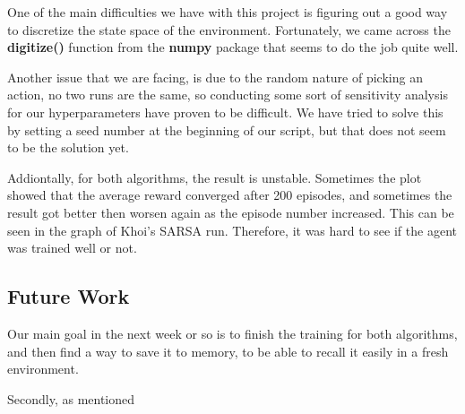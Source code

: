 \documentclass[nohyperref]{article}
\theoremstyle{plain}
\theoremstyle{definition}
\theoremstyle{remark}
\newcommand{\cnote}[1]{\textsf{\color{blue} [#1]}}
\begin{document}
One of the main difficulties we have with this project is figuring out a good way to discretize the state space of the environment.
Fortunately, we came across the \textbf{digitize()} function from the \textbf{numpy} package that seems to do the job quite well.

Another issue that we are facing, is due to the random nature of picking an action, no two runs are the same, so conducting some sort of
sensitivity analysis for our hyperparameters have proven to be difficult. We have tried to solve this by setting a seed number at the beginning
of our script, but that does not seem to be the solution yet.

Addiontally, for both algorithms, the result is unstable. Sometimes the plot showed that the average reward converged after 200 episodes, 
and sometimes the result got better then worsen again as the episode number increased. This can be seen in the graph of Khoi's SARSA run.
Therefore, it was hard to see if the agent was trained well or not.

\subsection*{Future Work}

Our main goal in the next week or so is to finish the training for both algorithms, and then find a way to save it to memory, to be able 
to recall it easily in a fresh environment.

Secondly, as mentioned 



\end{document}
